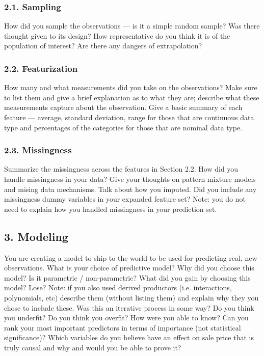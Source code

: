 \documentclass[12pt]{article}
\begin{document}
\begin{tcolorbox}
\subsubsection*{2.1. Sampling}

How did you sample the observations --- is it a simple random sample? Was there thought given to its design? How representative do you think it is of the population of interest? Are there any dangers of extrapolation?


\subsubsection*{2.2. Featurization}

How many and what measurements did you take on the observations? Make sure to list them and give a brief explanation as to what they are; describe what these measurements capture about the observation. Give a basic summary of each feature --- average, standard deviation, range for those that are continuous data type and percentages of the categories for those that are nominal data type.


\subsubsection*{2.3. Missingness}

Summarize the missingness across the features in Section 2.2. How did you handle missingness in your data? Give your thoughts on pattern mixture models and mising data mechanisms. Talk about how you imputed. Did you include any missingness dummy variables in your expanded feature set? Note: you do not need to explain how you handled missingness in your prediction set.


\subsection*{3. Modeling}

You are creating a model to ship to the world to be used for predicting real, new observations. What is your choice of predictive model? Why did you choose this model? Is it parametric / non-parametric? What did you gain by choosing this model? Lose? Note: if you also used derived productors (i.e. interactions, polynomials, etc) describe them (without listing them) and explain why they you chose to include these. Was this an iterative process in some way? Do you think you underfit? Do you think you overfit? How were you able to know? Can you rank your most important predictors in terms of importance (not statistical significance)? Which variables do you believe have an effect on sale price that is truly causal and why and would you be able to prove it?


\end{tcolorbox}
\end{document}
